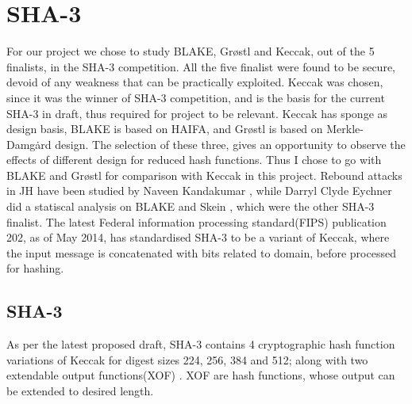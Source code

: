 \chapter{SHA-3}

For our project we chose to study BLAKE, Gr{\o}stl and Keccak, out of the 5 finalists, in the SHA-3 competition. 
All the five finalist were found to be secure, devoid of any weakness that can be practically exploited. Keccak
was chosen, since it was the winner of SHA-3 competition, and is the basis for the current SHA-3 in draft, thus
required for project to be relevant. Keccak has sponge as design basis, BLAKE is based on HAIFA, and Gr{\o}stl
is based on Merkle-Damg\.{a}rd design. The selection of these three, gives an opportunity to observe the effects 
of different design for reduced hash functions. Thus I chose to go with BLAKE and Gr{\o}stl for comparison with
Keccak in this project. Rebound attacks in JH have been studied by Naveen Kandakumar \cite{00043}, while Darryl
Clyde Eychner did a statiscal analysis on BLAKE and Skein \cite{00030}, which were the other SHA-3 finalist. The
latest Federal information processing standard(FIPS) publication 202, as of May 2014, has standardised SHA-3 to
be a variant of Keccak, where the input message is concatenated with bits related to domain, before processed 
for hashing.

\section{SHA-3}

As per the latest proposed draft, SHA-3 contains 4 cryptographic hash function variations of Keccak for digest sizes
224, 256, 384 and 512; along with two extendable output functions(XOF) \cite{00042}. XOF are hash functions, whose 
output can be extended to desired length.

